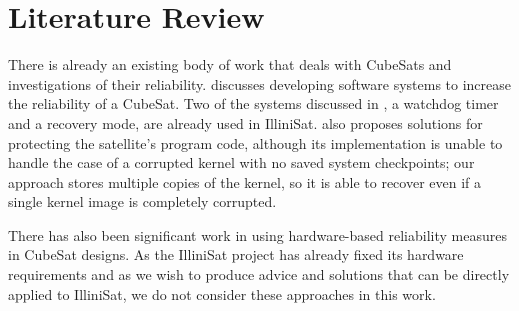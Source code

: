 \section{Literature Review}

There is already an existing body of work that deals with CubeSats and investigations of their reliability.  \cite{odegaard2013error} discusses developing software systems to increase the reliability of a CubeSat.  Two of the systems discussed in \cite{odegaard2013error}, a watchdog timer and a recovery mode, are already used in IlliniSat.  \cite{odegaard2013error} also proposes solutions for protecting the satellite's program code, although its implementation is unable to handle the case of a corrupted kernel with no saved system checkpoints; our approach stores multiple copies of the kernel, so it is able to recover even if a single kernel image is completely corrupted.

There has also been significant work in using hardware-based reliability measures in CubeSat designs.  As the IlliniSat project has already fixed its hardware requirements and as we wish to produce advice and solutions that can be directly applied to IlliniSat, we do not consider these approaches in this work.
